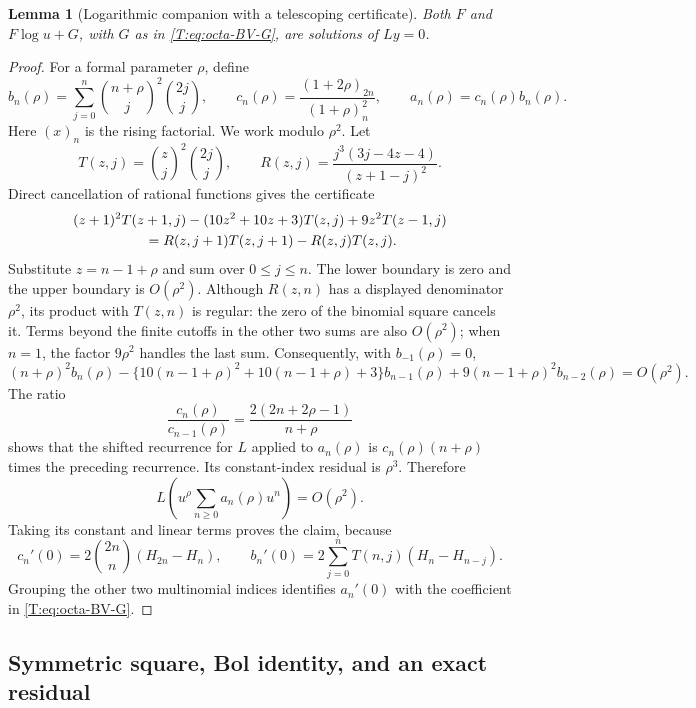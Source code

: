 \documentclass[11pt,a4paper]{article}
\newtheorem{lemma}[theorem]{Lemma}
\theoremstyle{definition}\newtheorem{definition}[theorem]{Definition}
\theoremstyle{remark}\newtheorem{remark}[theorem]{Remark}
\numberwithin{equation}{section}
\begin{document}
\begin{lemma}[Logarithmic companion with a telescoping certificate]
\label{T:lem:octa-logcomp}
Both $F$ and $F\log u+G$, with $G$ as in
\eqref{T:eq:octa-BV-G}, are solutions of $Ly=0$.
\end{lemma}
\begin{proof}
For a formal parameter $\rho$, define
\[
 b_n(\rho)=\sum_{j=0}^n\binom{n+\rho}{j}^{\!2}\binom{2j}{j},
 \qquad
 c_n(\rho)=\frac{(1+2\rho)_{2n}}{(1+\rho)_n^2},
 \qquad a_n(\rho)=c_n(\rho)b_n(\rho).
\]
Here $(x)_n$ is the rising factorial.  We work modulo $\rho^2$.
Let
\[
 T(z,j)=\binom zj^2\binom{2j}{j},\qquad
 R(z,j)=\frac{j^3(3j-4z-4)}{(z+1-j)^2}.
\]
Direct cancellation of rational functions gives the certificate
\begin{align*}
 &(z+1)^2T(z+1,j)-(10z^2+10z+3)T(z,j)
                      +9z^2T(z-1,j)\\
 &\hspace{18mm}=R(z,j+1)T(z,j+1)-R(z,j)T(z,j).
\end{align*}
Substitute $z=n-1+\rho$ and sum over $0\leq j\leq n$.
The lower boundary is zero and the upper boundary is $O(\rho^2)$.
Although $R(z,n)$ has a displayed denominator $\rho^2$, its product
with $T(z,n)$ is regular: the zero of the binomial square cancels it.
Terms beyond the finite cutoffs in the other two sums are also
$O(\rho^2)$; when $n=1$, the factor $9\rho^2$ handles the last sum.
Consequently, with $b_{-1}(\rho)=0$,
\[
 (n+\rho)^2b_n(\rho)
 -\{10(n-1+\rho)^2+10(n-1+\rho)+3\}b_{n-1}(\rho)
 +9(n-1+\rho)^2b_{n-2}(\rho)=O(\rho^2).
\]
The ratio
\[
 \frac{c_n(\rho)}{c_{n-1}(\rho)}
       =\frac{2(2n+2\rho-1)}{n+\rho}
\]
shows that the shifted recurrence for $L$ applied to $a_n(\rho)$
is $c_n(\rho)(n+\rho)$ times the preceding recurrence.
Its constant-index residual is $\rho^3$.
Therefore
\[
 L\left(u^\rho\sum_{n\geq0}a_n(\rho)u^n\right)=O(\rho^2).
\]
Taking its constant and linear terms proves the claim, because
\[
 c_n'(0)=2\binom{2n}{n}(H_{2n}-H_n),\qquad
 b_n'(0)=2\sum_{j=0}^nT(n,j)(H_n-H_{n-j}).
\]
Grouping the other two multinomial indices identifies $a_n'(0)$
with the coefficient in \eqref{T:eq:octa-BV-G}.
\end{proof}

\subsection{Symmetric square, Bol identity, and an exact residual}
\end{document}
